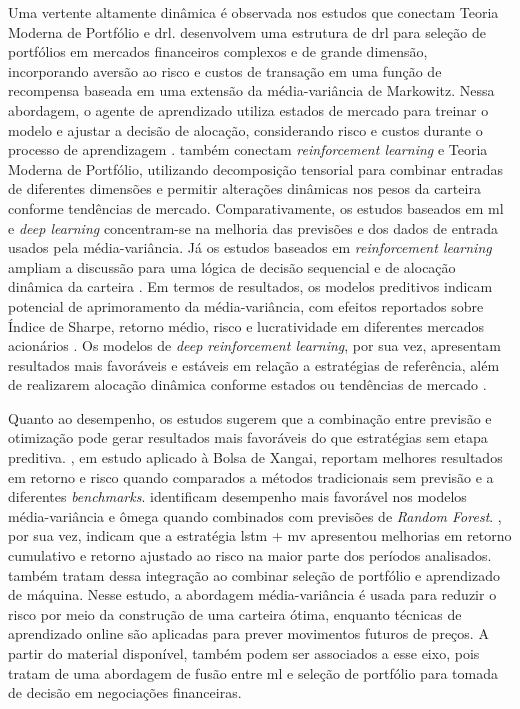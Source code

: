 Uma vertente altamente dinâmica é observada nos estudos que conectam Teoria Moderna de Portfólio e \acf{drl}.  desenvolvem uma estrutura de \acs{drl} para seleção de portfólios em mercados financeiros complexos e de grande dimensão, incorporando aversão ao risco e custos de transação em uma função de recompensa baseada em uma extensão da média-variância de Markowitz. Nessa abordagem, o agente de aprendizado utiliza estados de mercado para treinar o modelo e ajustar a decisão de alocação, considerando risco e custos durante o processo de aprendizagem \cite{jiang2024deep}.  também conectam \textit{reinforcement learning} e Teoria Moderna de Portfólio, utilizando decomposição tensorial para combinar entradas de diferentes dimensões e permitir alterações dinâmicas nos pesos da carteira conforme tendências de mercado. Comparativamente, os estudos baseados em \acl{ml} e \textit{deep learning} concentram-se na melhoria das previsões e dos dados de entrada usados pela média-variância. Já os estudos baseados em \textit{reinforcement learning} ampliam a discussão para uma lógica de decisão sequencial e de alocação dinâmica da carteira \cite{chaweewanchon2022markowitz,du2022mean,jang2023deep,jiang2024deep}. Em termos de resultados, os modelos preditivos indicam potencial de aprimoramento da média-variância, com efeitos reportados sobre Índice de Sharpe, retorno médio, risco e lucratividade em diferentes mercados acionários \cite{chaweewanchon2022markowitz,du2022mean}. Os modelos de \textit{deep reinforcement learning}, por sua vez, apresentam resultados mais favoráveis e estáveis em relação a estratégias de referência, além de realizarem alocação dinâmica conforme estados ou tendências de mercado \cite{jang2023deep,jiang2024deep}.

Quanto ao desempenho, os estudos sugerem que a combinação entre previsão e otimização pode gerar resultados mais favoráveis do que estratégias sem etapa preditiva. , em estudo aplicado à Bolsa de Xangai, reportam melhores resultados em retorno e risco quando comparados a métodos tradicionais sem previsão e a diferentes \textit{benchmarks}.  identificam desempenho mais favorável nos modelos média-variância e ômega quando combinados com previsões de \textit{Random Forest}. , por sua vez, indicam que a estratégia \acs{lstm} + \acs{mv} apresentou melhorias em retorno cumulativo e retorno ajustado ao risco na maior parte dos períodos analisados.  também tratam dessa integração ao combinar seleção de portfólio e aprendizado de máquina. Nesse estudo, a abordagem média-variância é usada para reduzir o risco por meio da construção de uma carteira ótima, enquanto técnicas de aprendizado online são aplicadas para prever movimentos futuros de preços. A partir do material disponível, também podem ser associados a esse eixo, pois tratam de uma abordagem de fusão entre \acl{ml} e seleção de portfólio para tomada de decisão em negociações financeiras.


